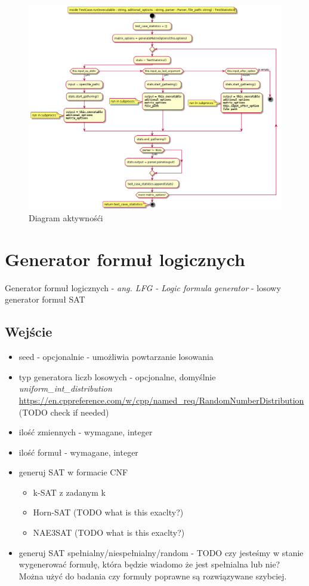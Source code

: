 \documentclass[a4paper,12pt]{article}
\begin{document}
\begin{figure}[H]
  \centering
  \includegraphics[width=\textwidth]{benchmark/activity_diagrams/test_case_run.png}
  \caption{Diagram aktywnośći}
\end{figure}

\section{Generator formuł logicznych} \label{LFG}

Generator formuł logicznych - \textit{ang. LFG - Logic formula generator} - losowy generator formuł SAT

\subsection{Wejście}

\begin{itemize}
  \item seed - opcjonalnie - umożliwia powtarzanie losowania
  \item typ generatora liczb losowych - opcjonalne, domyślnie \textit{uniform\_int\_distribution} \url{https://en.cppreference.com/w/cpp/named_req/RandomNumberDistribution} (TODO check if needed)
  \item ilość zmiennych - wymagane, integer
  \item ilość formuł - wymagane, integer
  \item generuj \gls{SAT} w formacie \gls{CNF}
    \begin{itemize}
      \item k-SAT z zadanym k
      \item Horn-SAT (TODO what is this exaclty?)
      \item NAE3SAT (TODO what is this exaclty?)
    \end{itemize}
  \item generuj \gls{SAT} spełnialny/niespełnialny/random - TODO czy jesteśmy w stanie wygenerować formułę, która będzie wiadomo że jest spełnialna lub nie? Można użyć do badania czy formuły poprawne są rozwiązywane szybciej.
\end{itemize}
\end{document}
